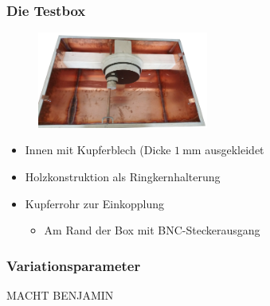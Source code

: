 \documentclass[accentcolor=tud9b, colorbacktitle, inverttitle]{tudbeamer}
\begin{document}
\begin{frame}\frametitle{Die Testbox}
\vspace{-1em}
\begin{multicols}{2}
	\begin{figure}[h]
		\centering
		\includegraphics[width=0.5\textwidth]{boxleer}
	\end{figure}
	\vfill\null
	\columnbreak
	\begin{itemize}
		\item Innen mit Kupferblech (Dicke $\SI{1}{\milli\meter}$ ausgekleidet
		\item Holzkonstruktion als Ringkernhalterung
		\item Kupferrohr zur Einkopplung
		\begin{itemize}
			\item Am Rand der Box mit BNC-Steckerausgang 
		\end{itemize}
	\end{itemize}
\end{multicols}
\end{frame}

\begin{frame}\frametitle{Variationsparameter}
{\Huge MACHT BENJAMIN}
\end{frame}
\end{document}
